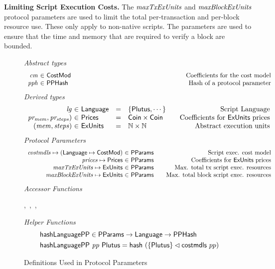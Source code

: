 \textbf{Limiting Script Execution Costs.}
The $\mathit{maxTxExUnits}$ and $\mathit{maxBlockExUnits}$ protocol parameters are
used to limit the total per-transaction and per-block resource use. These only apply to non-native scripts.
The parameters are used to ensure that the time and memory that are required to verify a block are bounded. %

\begin{figure*}[htb]
  \emph{Abstract types}
  \begin{equation*}
    \begin{array}{r@{~\in~}l@{\qquad\qquad\qquad\qquad\qquad\qquad\qquad\qquad\qquad}r}
      \var{cm} & \CostMod & \text{Coefficients for the cost model} \\
      \var{pph} & \PPHash & \text{Hash of a protocol parameter}
    \end{array}
  \end{equation*}
  \emph{Derived types}
  \begin{equation*}
    \begin{array}{r@{~\in~}l@{\quad=\quad}l@{\qquad}r}
      \var{lg}
      & \Language
      & \{\Plutus, \dotsb\}
      & \text{Script Language}
      \\
      \var{pr_{mem}, pr_{steps})}
      & \Prices
      & \Coin \times \Coin
      & \text {Coefficients for $\ExUnits$ prices}
      \\
      \var{(mem, steps)}
      & \ExUnits
      & \N \times \N
      & \text{Abstract execution units} \\
    \end{array}
  \end{equation*}
  \emph{Protocol Parameters}
  \begin{equation*}
      \begin{array}{r@{~\in~}l@{\qquad}r}
        \var{costmdls} \mapsto (\Language \mapsto \CostMod) & \PParams & \text{Script exec. cost model}\\
        \var{prices} \mapsto \Prices & \PParams & \text{Coefficients for $\ExUnits$ prices} \\
        \var{maxTxExUnits} \mapsto \ExUnits & \PParams & \text{Max. total tx script exec. resources}\\
        \var{maxBlockExUnits} \mapsto \ExUnits & \PParams & \text{Max. total block script exec. resources}\\
      \end{array}
  \end{equation*}
  \emph{Accessor Functions}
  \begin{center}
  ,~,~,~
  \end{center}
  \emph{Helper Functions}
  \begin{align*}
    & \mathsf{hashLanguagePP} \in \mathsf{PParams} \to \mathsf{Language} \to \mathsf{PPHash} \\
    & \mathsf{hashLanguagePP}~\mathit{pp}~\mathsf{Plutus} = \mathsf{hash}~(\{\mathsf{Plutus}\} \lhd \mathsf{costmdls}~{pp})
  \end{align*}
  \caption{Definitions Used in Protocol Parameters}
  \label{fig:defs:protocol-parameters}
\end{figure*}
